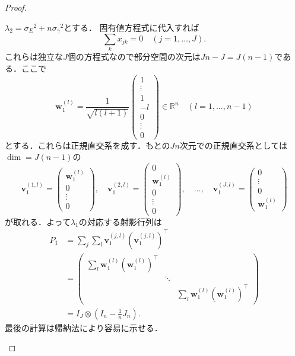\begin{proof}
\begin{enumerate}
    \(\lambda_2 = \sigma_E{}^2 + n \sigma_\gamma{}^2\)とする．
    固有値方程式に代入すれば
    \[ \sum_k x_{jk} = 0 \quad (j=1, \dots, J) . \]
    これらは独立な\(J\)個の方程式なので部分空間の次元は\(Jn - J = J(n-1)\)である．ここで
    \[
    \boldsymbol{w}_1^{(l)}
    = \frac{1}{\sqrt{l(l+1)}}
    \begin{pmatrix}
      1 \\ \vdots \\ 1 \\ -l \\ 0 \\ \vdots \\ 0
    \end{pmatrix}
    \in \mathbb{R}^n
      \quad (l = 1, \dots, n-1)
    \]
    とする．これらは正規直交系を成す．もとの\(Jn\)次元での正規直交系としては\(\dim = J(n-1)\)の
    \[
      \boldsymbol{v}_1^{(1, l)} =
      \begin{pmatrix}
        \boldsymbol{w}_1^{(l)} \\ 0 \\ \vdots \\ 0
      \end{pmatrix}
      , \quad
      \boldsymbol{v}_1^{(2, l)} =
      \begin{pmatrix}
        0 \\ \boldsymbol{w}_1^{(l)} \\ 0 \\ \vdots \\ 0
      \end{pmatrix}
      , \quad
      \dots
      , \quad
      \boldsymbol{v}_1^{(J, l)} =
      \begin{pmatrix}
        0 \\ \vdots \\ 0 \\ \boldsymbol{w}_1^{(l)}
      \end{pmatrix}
    \]
    が取れる．よって\(\lambda_1\)の対応する射影行列は
    \begin{align*}
      P_1 &= \sum_j \sum_l \boldsymbol{v}_1^{(j, l)} (\boldsymbol{v}_1^{(j, l)} )^\top \\
      &=
      \begin{pmatrix}
        \sum_l \boldsymbol{w}_1^{(l)} (\boldsymbol{w}_1^{(l)})^\top & & \\
        & \ddots & \\
        & & \sum_l \boldsymbol{w}_1^{(l)} (\boldsymbol{w}_1^{(l)})^\top
      \end{pmatrix}
      \\
      &= I_J \otimes \left( I_n - \frac{1}{n} J_n \right) .
    \end{align*}
    最後の計算は帰納法により容易に示せる．


\end{enumerate}
\end{proof}
